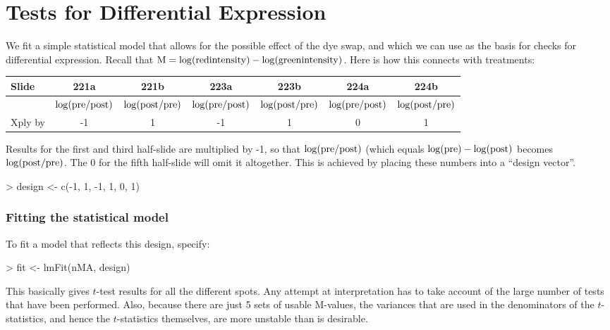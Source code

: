 \documentclass[a4paper,9pt]{article}
\begin{document}
\section{Tests for Differential Expression}
We fit a simple statistical model that allows for the possible
effect of the dye swap, and which we can use as the basis for
checks for differential expression.  
Recall that ${\rm M} = \log({\rm red intensity}) - \log({\rm green intensity})$.
Here is how this connects with treatments:
\vspace*{3pt}

\begin{tabular}{lcccccc}
Slide & 221a & 221b & 223a & 223b & 224a & 224b \\
\hline
 & $\log({\rm pre/post)}$ & $\log({\rm post/pre)}$
 & $\log({\rm pre/post)}$ & $\log({\rm post/pre)}$
 & $\log({\rm pre/post)}$ & $\log({\rm post/pre)}$ \\
Xply by & -1 & 1 &  -1 & 1 &  0 & 1 \\
\hline
\end{tabular}
\vspace*{3pt}

Results for the first and third half-slide are multiplied by -1,
so that $\log({\rm pre/post)}$ (which equals 
$\log({\rm pre}) - \log({\rm post)}$ becomes $\log({\rm post/pre)}$.
The 0 for the fifth half-slide will omit it altogether.
This is achieved by placing these numbers into a ``design vector''.
\begin{Schunk}
\begin{Sinput}
> design <- c(-1, 1, -1, 1, 0, 1)
\end{Sinput}
\end{Schunk}

\subsubsection*{Fitting the statistical model}
To fit a model that reflects this design, specify:
\begin{Schunk}
\begin{Sinput}
> fit <- lmFit(nMA, design)
\end{Sinput}
\end{Schunk}
This basically gives $t$-test results for all the different spots.
Any attempt at interpretation has to take account of the large number
of tests that have been performed.  Also, because there are just 5
sets of usable M-values, the variances that are used in the
denominators of the $t$-statistics, and hence the $t$-statistics
themselves, are more unstable than is desirable.  
\end{document}
